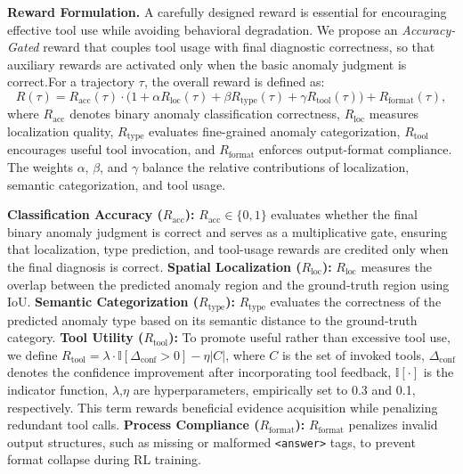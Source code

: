 \documentclass{llmxive}
\begin{document}
\textbf{Reward Formulation.}
A carefully designed reward is essential for encouraging effective tool use while avoiding behavioral degradation. 
We propose an \emph{Accuracy-Gated} reward that couples tool usage with final diagnostic correctness, so that auxiliary rewards are activated only when the basic anomaly judgment is correct.For a trajectory $\tau$, the overall reward is defined as:
\begin{equation}
R(\tau) =
R_{\text{acc}}(\tau)
\cdot
\Big(
1 + \alpha R_{\text{loc}}(\tau)
+ \beta R_{\text{type}}(\tau)
+ \gamma R_{\text{tool}}(\tau)
\Big)
+
R_{\text{format}}(\tau),
\end{equation}
where $R_{\text{acc}}$ denotes binary anomaly classification correctness, $R_{\text{loc}}$ measures localization quality, $R_{\text{type}}$ evaluates fine-grained anomaly categorization, $R_{\text{tool}}$ encourages useful tool invocation, and $R_{\text{format}}$ enforces output-format compliance. 
The weights $\alpha$, $\beta$, and $\gamma$ balance the relative contributions of localization, semantic categorization, and tool usage.

 \textbf{Classification Accuracy ($R_{\text{acc}}$):} $R_{\text{acc}} \in \{0,1\}$ evaluates whether the final binary anomaly judgment is correct and serves as a multiplicative gate, ensuring that localization, type prediction, and tool-usage rewards are credited only when the final diagnosis is correct.  \textbf{Spatial Localization ($R_{\text{loc}}$):} $R_{\text{loc}}$ measures the overlap between the predicted anomaly region and the ground-truth region using IoU.  \textbf{Semantic Categorization ($R_{\text{type}}$):} $R_{\text{type}}$ evaluates the correctness of the predicted anomaly type based on its semantic distance to the ground-truth category.  \textbf{Tool Utility ($R_{\text{tool}}$):} To promote useful rather than excessive tool use, we define $R_{\text{tool}}=\lambda \cdot \mathbb{I}[\Delta_{\text{conf}}>0]-\eta|C|$, where $C$ is the set of invoked tools, $\Delta_{\text{conf}}$ denotes the confidence improvement after incorporating tool feedback, $\mathbb{I}[\cdot]$ is the indicator function, $\lambda$,$\eta$ are hyperparameters, empirically set to 0.3 and 0.1, respectively. This term rewards beneficial evidence acquisition while penalizing redundant tool calls.  \textbf{Process Compliance ($R_{\text{format}}$):} $R_{\text{format}}$ penalizes invalid output structures, such as missing or malformed \texttt{<answer>} tags, to prevent format collapse during RL training.


\end{document}
